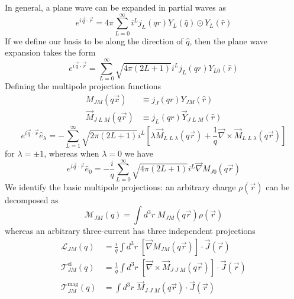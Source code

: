 \documentclass{book}[letterpaper,12pt]
\begin{document}
In general, a plane wave can be expanded in partial waves as
\begin{equation}
e^{i\vec{q}\cdot\vec{r}}=4\pi \sum_{L=0}^{\infty}i^Lj_L(qr)Y_L(\hat{q})\odot Y_L(\hat{r})
\end{equation}
If we define our basis to be along the direction of $\hat{q}$, then the plane wave expansion takes the form
\begin{equation}
e^{i\vec{q}\cdot\vec{r}}=\sum_{L=0}^{\infty}\sqrt{4\pi(2L+1)}i^Lj_L(qr)Y_{L0}(\hat{r})
\end{equation}
Defining the multipole projection functions
\begin{equation}
\begin{split}
M_{JM}(q\vec{x})&\equiv j_J(qr)Y_{JM}(\hat{r})\\
\vec{M}_{J\;L\;M}(q\vec{r})&\equiv j_L(qr)\vec{Y}_{J\;L\;M}(\hat{r})
\end{split}
\end{equation}
\begin{equation}
e^{i\vec{q}\cdot\vec{r}}\hat{e}_{\lambda}=-\sum_{L=1}^{\infty}\sqrt{2\pi(2L+1)}i^L\left[\lambda \vec{M}_{L\;L\;\lambda}(q\vec{r})+\frac{1}{q}\vec{\nabla}\times\vec{M}_{L\;L\;\lambda}(q\vec{r})\right]
\end{equation}
for $\lambda = \pm 1$, whereas when $\lambda = 0$ we have
\begin{equation}
e^{i\vec{q}\cdot\vec{r}}\hat{e}_0=-\frac{i}{q}\sum_{L=0}^{\infty}\sqrt{4\pi(2L+1)}i^L\vec{\nabla}M_{J0}(q\vec{r})
\end{equation}
We identify the basic multipole projections: an arbitrary charge $\rho(\vec{r})$ can be decomposed as
\begin{equation}
\mathcal{M}_{JM}(q)=\int d^3r\;M_{JM}(q\vec{r})\rho(\vec{r})
\end{equation}
whereas an arbitrary three-current has three independent projections 
\begin{equation}
\begin{split}
\mathcal{L}_{JM}(q)&=\frac{i}{q}\int d^3r\;\left[\vec{\nabla}M_{JM}(q\vec{r})\right]\cdot\vec{J}(\vec{r})\\
\mathcal{T}^\mathrm{el}_{JM}(q)&=\frac{1}{q}\int d^3r\;\left[\vec{\nabla}\times\vec{M}_{J\;J\;M}(q\vec{r})\right]\cdot\vec{J}(\vec{r})\\
\mathcal{T}^\mathrm{mag}_{JM}(q)&=\int d^3r\;\vec{M}_{J\;J\;M}(q\vec{r})\cdot\vec{J}(\vec{r})
\end{split}
\end{equation}
\end{document}

